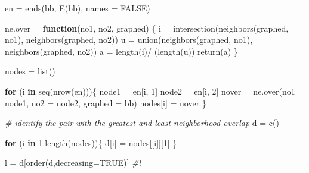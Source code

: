 \documentclass[
]{article}
\newenvironment{Shaded}{\begin{snugshade}}{\end{snugshade}}
\newcommand{\AttributeTok}[1]{\textcolor[rgb]{0.77,0.63,0.00}{#1}}
\newcommand{\CommentTok}[1]{\textcolor[rgb]{0.56,0.35,0.01}{\textit{#1}}}
\newcommand{\ConstantTok}[1]{\textcolor[rgb]{0.00,0.00,0.00}{#1}}
\newcommand{\ControlFlowTok}[1]{\textcolor[rgb]{0.13,0.29,0.53}{\textbf{#1}}}
\newcommand{\DecValTok}[1]{\textcolor[rgb]{0.00,0.00,0.81}{#1}}
\newcommand{\FunctionTok}[1]{\textcolor[rgb]{0.00,0.00,0.00}{#1}}
\newcommand{\NormalTok}[1]{#1}
\newcommand{\OtherTok}[1]{\textcolor[rgb]{0.56,0.35,0.01}{#1}}
\newcommand{\SpecialCharTok}[1]{\textcolor[rgb]{0.00,0.00,0.00}{#1}}
\begin{document}
\begin{Shaded}
\begin{Highlighting}[]
\NormalTok{en }\OtherTok{=} \FunctionTok{ends}\NormalTok{(bb, }\FunctionTok{E}\NormalTok{(bb), }\AttributeTok{names =} \ConstantTok{FALSE}\NormalTok{)}

\NormalTok{ne.over }\OtherTok{=} \ControlFlowTok{function}\NormalTok{(no1, no2, graphed) \{}
\NormalTok{  i }\OtherTok{=} \FunctionTok{intersection}\NormalTok{(}\FunctionTok{neighbors}\NormalTok{(graphed, no1), }\FunctionTok{neighbors}\NormalTok{(graphed, no2))}
\NormalTok{  u }\OtherTok{=} \FunctionTok{union}\NormalTok{(}\FunctionTok{neighbors}\NormalTok{(graphed, no1), }\FunctionTok{neighbors}\NormalTok{(graphed, no2))}
\NormalTok{  a }\OtherTok{=} \FunctionTok{length}\NormalTok{(i)}\SpecialCharTok{/}\NormalTok{ (}\FunctionTok{length}\NormalTok{(u)) }
  \FunctionTok{return}\NormalTok{(a)}
\NormalTok{\}}

\NormalTok{nodes }\OtherTok{=} \FunctionTok{list}\NormalTok{()}

\ControlFlowTok{for}\NormalTok{ (i }\ControlFlowTok{in} \FunctionTok{seq}\NormalTok{(}\FunctionTok{nrow}\NormalTok{(en)))\{}
\NormalTok{  node1 }\OtherTok{=}\NormalTok{ en[i, }\DecValTok{1}\NormalTok{]}
\NormalTok{  node2 }\OtherTok{=}\NormalTok{ en[i, }\DecValTok{2}\NormalTok{]}
\NormalTok{  nover }\OtherTok{=} \FunctionTok{ne.over}\NormalTok{(}\AttributeTok{no1 =}\NormalTok{ node1, }\AttributeTok{no2 =}\NormalTok{ node2, }\AttributeTok{graphed =}\NormalTok{ bb)}
\NormalTok{  nodes[i] }\OtherTok{=}\NormalTok{ nover}
\NormalTok{\}}


\CommentTok{\# identify the pair with the greatest and least neighborhood overlap}
\NormalTok{d }\OtherTok{=} \FunctionTok{c}\NormalTok{()}

\ControlFlowTok{for}\NormalTok{ (i }\ControlFlowTok{in} \DecValTok{1}\SpecialCharTok{:}\FunctionTok{length}\NormalTok{(nodes))\{}
\NormalTok{  d[i] }\OtherTok{=}\NormalTok{ nodes[[i]][}\DecValTok{1}\NormalTok{]}
\NormalTok{\}}

\NormalTok{l }\OtherTok{=}\NormalTok{ d[}\FunctionTok{order}\NormalTok{(d,}\AttributeTok{decreasing=}\ConstantTok{TRUE}\NormalTok{)]}
\CommentTok{\#l}
\end{Highlighting}
\end{Shaded}
\end{document}
